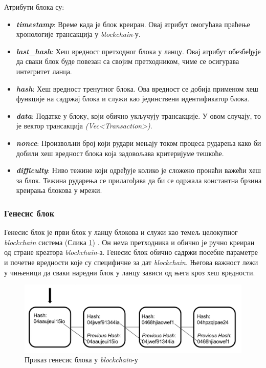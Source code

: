 \documentclass[12pt, a4paper]{article}
\begin{document}
Атрибути блока су:
\begin{itemize}
    \item \textbf{\textit{timestamp}}: Време када је блок креиран. Овај атрибут омогућава праћење хронологије трансакција у \textit{blockchain}-у.
    \item \textbf{\textit{last\_hash}}: Хеш вредност претходног блока у ланцу. Овај атрибут обезбеђује да сваки блок буде повезан са својим претходником, чиме се осигурава интегритет ланца.
    \item \textbf{\textit{hash}}: Хеш вредност тренутног блока. Ова вредност се добија применом хеш функције на садржај блока и служи као јединствени идентификатор блока.
    \item \textbf{\textit{data}}: Податке у блоку, који обично укључују трансакције. У овом случају, то је вектор трансакција \textit{(Vec<Transaction>)}.
    \item \textbf{\textit{nonce}}: Произвољни број који рудари мењају током процеса рударења како би добили хеш вредност блока која задовољава критеријуме тешкоће.
    \item \textbf{\textit{difficulty}}: Ниво тежине који одређује колико је сложено пронаћи важећи хеш за блок. Тежина рударења се прилагођава да би се одржала константна брзина креирања блокова у мрежи.
\end{itemize}



\subsubsection{Генесис блок}
Генесис блок је први блок у ланцу блокова и служи као темељ целокупног \textit{blockchain} система (Слика \ref{fig:genesis-block}) \cite{8}. Он нема претходника и обично је ручно креиран од стране креатора \textit{blockchain}-а. Генесис блок обично садржи посебне параметре и почетне вредности које су специфичне за дат \textit{blockchain}. Његова важност лежи у чињеници да сваки наредни блок у ланцу зависи од њега кроз хеш вредности.

\begin{figure}[h]
    \centering
    \includegraphics[width=1\linewidth]{slike/genesis.png}
    \caption{Приказ генесис блока у \textit{blockchain}-у}
    \label{fig:genesis-block}
\end{figure}
\end{document}
